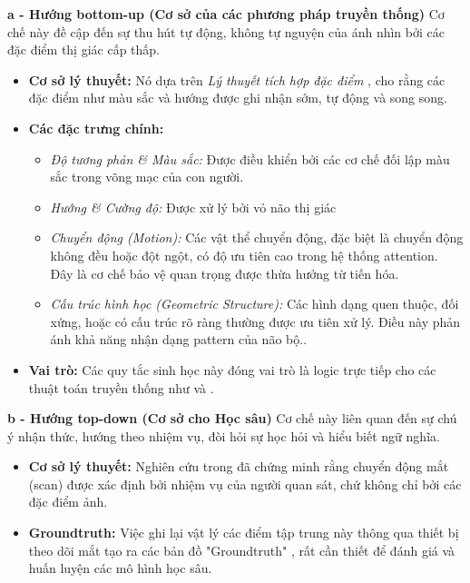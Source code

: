 \textbf{a - Hướng bottom-up (Cơ sở của các phương pháp truyền thống)}
Cơ chế này đề cập đến sự thu hút tự động, không tự nguyện của ánh nhìn bởi các đặc điểm thị giác cấp thấp.

\begin{itemize}
\item \textbf{Cơ sở lý thuyết:} Nó dựa trên \textit{Lý thuyết tích hợp đặc điểm} \cite{treisman1980feature}, cho rằng các đặc điểm như màu sắc và hướng được ghi nhận sớm, tự động và song song.
\item \textbf{Các đặc trưng chính:}
    \begin{itemize}
    \item \textit{Độ tương phản \& Màu sắc:} Được điều khiển bởi các cơ chế đối lập màu sắc trong võng mạc của con người.
    \item \textit{Hướng \& Cường độ:} Được xử lý bởi vỏ não thị giác
    \item \textit{Chuyển động (Motion):} Các vật thể chuyển động, đặc biệt là chuyển động không đều hoặc đột ngột, có độ ưu tiên cao trong hệ thống attention. Đây là cơ chế bảo vệ quan trọng được thừa hưởng từ tiến hóa.
    \item \textit{Cấu trúc hình học (Geometric Structure):} Các hình dạng quen thuộc, đối xứng, hoặc có cấu trúc rõ ràng thường được ưu tiên xử lý. Điều này phản ánh khả năng nhận dạng pattern của não bộ..
    \end{itemize}
\item \textbf{Vai trò:} Các quy tắc sinh học này đóng vai trò là logic trực tiếp cho các thuật toán truyền thống như \cite{itti1998model} và \cite{cheng2011global}.
\end{itemize}

\textbf{b -  Hướng top-down (Cơ sở cho Học sâu)}
Cơ chế này liên quan đến sự chú ý nhận thức, hướng theo nhiệm vụ, đòi hỏi sự học hỏi và hiểu biết ngữ nghĩa.

\begin{itemize}
\item \textbf{Cơ sở lý thuyết:} Nghiên cứu trong \cite{yarbus1967eye} đã chứng minh rằng chuyển động mắt (scan) được xác định bởi nhiệm vụ của người quan sát, chứ không chỉ bởi các đặc điểm ảnh.
\item \textbf{Groundtruth:} Việc ghi lại vật lý các điểm tập trung này thông qua thiết bị theo dõi mắt tạo ra các bản đồ "Groundtruth" \cite{consensus_saliency}, rất cần thiết để đánh giá và huấn luyện các mô hình học sâu.
\end{itemize}

